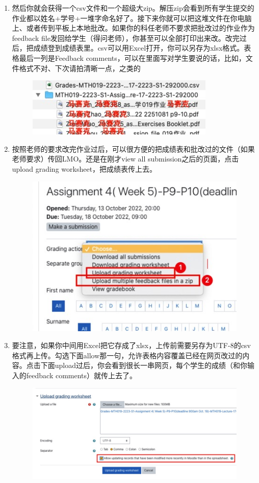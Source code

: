 \begin{enumerate}
\begin{figure}[H]
        \end{figure}
    \item 然后你就会获得一个csv文件和一个超级大zip。解压zip会看到所有学生提交的作业都以姓名+学号+一堆字命名好了。接下来你就可以把这堆文件在你电脑上、或者传到平板上本地批改。如果你的科任老师不要求把批改过的作业作为feedback file发回给学生（得问老师），你甚至可以全部打印出来改。改完过后，把成绩登到成绩表里。csv可以用Excel打开，你可以另存为xlsx格式。表格最后一列是Feedback comments，可以在里面写对学生要说的话，比如，文件格式不对、下次请拍清晰一点，之类的
        \begin{figure}[H]
            \centering
            \includegraphics[width=0.5\columnwidth]{author-folder/Kai.Wu/LMO_Downloaded.jpg}
        \end{figure}
    \item 按照老师的要求改完作业过后，可以很方便的把成绩表和批改过的文件（如果老师要求）传回LMO。还是在刚才view all submission之后的页面，点击upload grading worksheet，把成绩表传上去。
        \begin{figure}[H]
            \centering
            \includegraphics[width=0.5\columnwidth]{author-folder/Kai.Wu/LMO_upload.jpg}
        \end{figure}
    \item 要注意，如果你中间用Excel把它存成了xlsx，上传前需要另存为UTF-8的csv格式再上传。勾选下面allow那一句，允许表格内容覆盖已经在网页改过的内容。点击下面upload过后，你会看到很长一串网页，每个学生的成绩（和你输入的feedback comments）就传上去了。
        \begin{figure}[H]
            \centering
            \includegraphics[width=0.8\columnwidth]{author-folder/Kai.Wu/LMO_upload_sheet.jpg}

\end{figure}
\end{enumerate}

